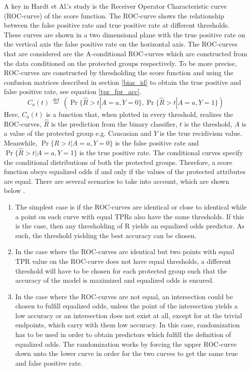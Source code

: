 \documentclass[11pt, fleqn, titlepage]{article}
\begin{document}
	A key in Hardt et Al.'s study is the Receiver Operator Characteristic curve (ROC-curve) of the score function. The ROC-curve shows the relationship between the false positive rate and true positive rate at different thresholds. These curves are shown in a two dimensional plane with the true positive rate on the vertical axis the false positive rate on the horizontal axis. The ROC-curves that are considered are the A-conditional ROC-curves which are constructed from the data conditioned on the protected groups respectively. To be more precise, ROC-curves are constructed by thresholding the score function and using the confusion matrices described in section \ref{bias_id} to obtain the true positive and false positive rate, see equation \ref{tpr_fpr_acc}.
	\begin{equation*}\label{key}
	C_{a}(t) \stackrel{\text { def }}{=}(\operatorname{Pr}\{\widehat{R}>t | A=a, Y=0\}, \operatorname{Pr}\{\widehat{R}>t | A=a, Y=1\})
	\end{equation*}
	Here, $C_{a}(t)$ is a function that, when plotted in every threshold, realizes the ROC-curves, $\hat{R}$ is the prediction from the binary classifier, $t$ is the threshold, $A$ is a value of the protected group e.g. Caucasian and $Y$ is the true recidivism value. Meanwhile, $\operatorname{Pr}\{\widehat{R}>t | A=a, Y=0\}$ is the false positive rate and $\operatorname{Pr}\{\widehat{R}>t | A=a, Y=1\}$ is the true positive rate. The conditional curves specify the conditional distributions of both the protected groups. Therefore, a score function obeys equalized odds if and only if the values of the protected attributes are equal. There are several scenarios to take into account, which are shown below \cite{equal_of_oppor}.
	\begin{enumerate}[font=\bfseries]
		\item The simplest case is if the ROC-curves are identical or close to identical while a point on each curve with equal TPRs also have the same thresholds. If this is the case, then any thresholding of R yields an equalized odds predictor. As such, the threshold yielding the best accuracy can be chosen.
		\item In the case where the ROC-curves are identical but two points with equal TPR value on the ROC-curve does not have equal thresholds, a different threshold will have to be chosen for each protected group such that the accuracy of the model is maximized and equalized odds is ensured.
		\item In the case where the ROC-curves are not equal, an intersection could be chosen to fulfill equalized odds, unless the point of the intersection yields a low accuracy or an intersection does not exist at all, except for at the trivial endpoints, which carry with them low accuracy. In this case, randomization has to be used in order to obtain predictors which fulfill the definition of equalized odds. The randomization works by forcing the upper ROC-curve down unto the lower curve in order for the two curves to get the same true and false positive rate.
	\end{enumerate}
\end{document}
